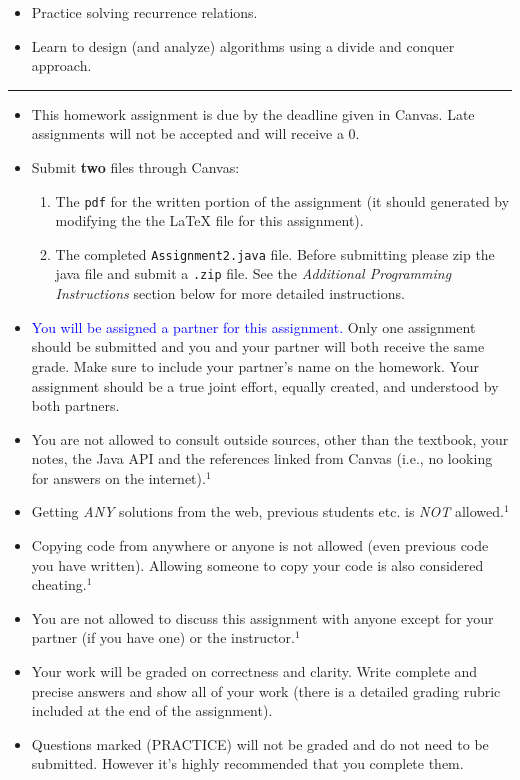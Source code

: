 \documentclass[11pt,answers]{exam}
\begin{document}
 \begin{itemize}
 \item Practice solving recurrence relations.
 \item Learn to design (and analyze) algorithms using a divide and conquer approach.
 \end{itemize}

\hrule
\vspace{2em}

\begin{itemize}
\item This homework assignment is due by the deadline given in Canvas.  Late assignments will not be accepted and will receive a 0.
\item Submit \textbf{two} files through Canvas:
\begin{enumerate}
\item The \texttt{pdf} for the written portion of the assignment (it should generated by modifying the the LaTeX file for this assignment).
\item The completed \texttt{Assignment2.java} file.  Before submitting please zip the java file and submit a \texttt{.zip} file.  See the \emph{Additional Programming Instructions} section below for more detailed instructions.
\end{enumerate}
\item \textcolor{blue}{You will be assigned a partner for this assignment.}  Only one assignment should be submitted and you and your partner will both receive the same grade.   Make sure to include your partner's name on the homework.  Your assignment should be a true joint effort, equally created, and understood by both partners. 
\item You are not allowed to consult outside sources, other than the textbook, your notes, the Java API and the references linked from Canvas (i.e., no looking for answers on the internet).$^1$
\item Getting \emph{ANY} solutions from the web, previous students etc. is \emph{NOT} allowed.$^1$ 
\item Copying code from anywhere or anyone is not allowed (even previous code you have written).  Allowing someone to copy your code is also considered cheating.$^1$
\item You are not allowed to discuss this assignment with anyone except for your partner (if you have one) or the instructor.$^1$
\item Your work will be graded on correctness and clarity.  Write complete and precise answers and show all of your work (there is a detailed grading rubric included at the end of the assignment).  
\item Questions marked (PRACTICE) will not be graded and do not need to be submitted.  However it's highly recommended that you complete them.
\end{itemize}
\end{document}
